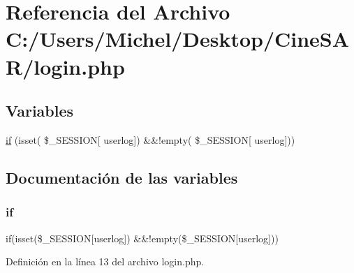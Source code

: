 \hypertarget{login_8php}{}\section{Referencia del Archivo C\+:/\+Users/\+Michel/\+Desktop/\+Cine\+S\+A\+R/login.php}
\label{login_8php}
\subsection*{Variables}
\begin{DoxyCompactItemize}
\item 
\mbox{\hyperlink{login_8php_aefb5893336d7ead40ae915367f4b82cc}{if}} (isset( \$\+\_\+\+S\+E\+S\+S\+I\+ON\mbox{[} \textquotesingle{}userlog\textquotesingle{}\mbox{]}) \&\&!empty( \$\+\_\+\+S\+E\+S\+S\+I\+ON\mbox{[} \textquotesingle{}userlog\textquotesingle{}\mbox{]}))
\end{DoxyCompactItemize}


\subsection{Documentación de las variables}
\mbox{\label{login_8php_aefb5893336d7ead40ae915367f4b82cc}} 
\subsubsection{\texorpdfstring{if}{if}}
{\footnotesize\ttfamily if(isset(\$\+\_\+\+S\+E\+S\+S\+I\+ON\mbox{[}\textquotesingle{}userlog\textquotesingle{}\mbox{]}) \&\&!empty(\$\+\_\+\+S\+E\+S\+S\+I\+ON\mbox{[}\textquotesingle{}userlog\textquotesingle{}\mbox{]}))}



Definición en la línea 13 del archivo login.\+php.

